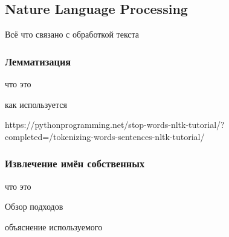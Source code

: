 \subsection{Nature Language Processing}
    Всё что связано с обработкой текста

    \subsubsection{Лемматизация}
        что это

        как используется

        https://pythonprogramming.net/stop-words-nltk-tutorial/?completed=/tokenizing-words-sentences-nltk-tutorial/
    \subsubsection{Извлечение имён собственных}
        что это

        Обзор подходов

        объяснение используемого
